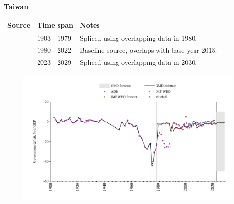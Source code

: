 \documentclass[12pt,a4paper,landscape]{article}
\begin{document}
\begin{adjustbox}{max totalsize={\paperwidth}{\paperheight},center}
\begin{minipage}[t][\textheight][t]{\textwidth}
\vspace*{0.5cm}
{}
\begin{center}
{\Large\bfseries Taiwan}
\end{center}
\vspace{0.5cm}
\begin{table}[H]
\centering
\small
\begin{tabular}{|l|l|l|}
\hline
\textbf{Source} & \textbf{Time span} & \textbf{Notes} \\
\hline
\rowcolor{white}\cite{Mitchell}& 1903 - 1979 &Spliced using overlapping data in 1980.\\
\rowcolor{lightgray}\cite{IMF_WEO}& 1980 - 2022 &Baseline source, overlaps with base year 2018.\\
\rowcolor{white}\cite{IMF_WEO_forecast}& 2023 - 2029 &Spliced using overlapping data in 2030.\\
\hline
\end{tabular}
\end{table}
\begin{figure}[H]
\centering
\includegraphics[width=\textwidth,height=0.6\textheight,keepaspectratio]{graphs/TWN_govdef_GDP.pdf}
\end{figure}
\end{minipage}
\end{adjustbox}
\end{document}
